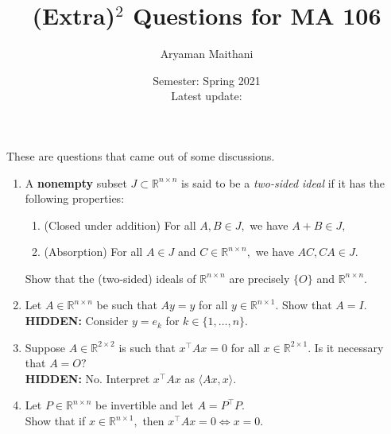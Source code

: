 \documentclass[12pt]{article}
\title{(Extra)\texorpdfstring{$^2$}{2} Questions for MA 106}
\author{Aryaman Maithani}%
\date{Semester: Spring 2021\\ Latest update: \DTMnow}
\newcommand{\hint}[1]{\textbf{HIDDEN:} {\color[rgb]{0.95, 0.95, 0.95}#1}}
\begin{document}
\maketitle

These are questions that came out of some discussions.

\begin{enumerate}[leftmargin=*]
	\item A \textbf{nonempty} subset $J \subset \mathbb{R}^{n \times n}$ is said to be a \emph{two-sided ideal} if it has the following properties:
	\begin{enumerate}
		\item (Closed under addition) For all $A, B \in J,$ we have $A + B \in J,$
		\item (Absorption) For all $A \in J$ and $C \in \mathbb{R}^{n \times n},$ we have $AC, CA \in J.$
	\end{enumerate}
	Show that the (two-sided) ideals of $\mathbb{R}^{n \times n}$ are precisely $\{O\}$ and $\mathbb{R}^{n \times n}.$
	\item Let $A \in \mathbb{R}^{n \times n}$ be such that $Ay = y$ for all $y \in \mathbb{R}^{n \times 1}.$ Show that $A = I.$\\
	\hint{Consider $y = e_k$ for $k \in \{1, \ldots, n\}.$}
	\item Suppose $A \in \mathbb{R}^{2 \times 2}$ is such that $x^\top Ax = 0$ for all $x \in \mathbb{R}^{2 \times 1}.$ Is it necessary that $A = O?$\\
	\hint{No. Interpret $x^\top Ax$ as $\langle Ax, x\rangle.$}
	\item Let $P \in \mathbb{R}^{n \times n}$ be invertible and let $A = P^{\top}P.$ \\
	Show that if $x \in \mathbb{R}^{n \times 1},$ then $x^\top Ax = 0 \iff x = 0.$
\end{enumerate}
\end{document}
